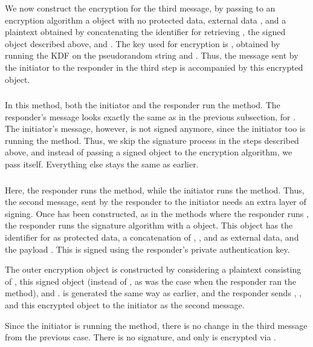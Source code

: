 We now construct the encryption for the third message, by passing to an \mAead encryption algorithm a \mCose object with no protected data, external data \mTHthree, and a plaintext obtained by concatenating the identifier for retrieving \mCredi, the signed object described above, and \mADthree. The key used for encryption is \mKthree, obtained by running the KDF on the pseudorandom string \mPRKthree and \mTHthree. Thus, the message sent by the initiator to the responder in the third step is \mCr accompanied by this encrypted object.

\subsubsection{\mStatStat}
In this method, both the initiator and the responder run the \mStat method. The responder's message looks exactly the same as in the previous subsection, for \mSigStat. The initiator's message, however, is not signed anymore, since the initiator too is running the \mStat method. Thus, we skip the signature process in the steps described above, and instead of passing a signed object to the \mAead encryption algorithm, we pass \mMacthree itself. Everything else stays the same as earlier.

\subsubsection{\mStatSig}
Here, the responder runs the \mSig method, while the initiator runs the \mStat method. Thus, the second message, sent by the responder to the initiator needs an extra layer of signing. Once \mMactwo has been constructed, as in the methods where the responder runs \mStat, the responder runs the signature algorithm with a \mCose object. This object has the identifier for \mCredr as protected data, a concatenation of \mTHtwo, \mCredr, and \mADtwo as external data, and the payload \mMactwo. This is signed using the responder's private authentication key.

The outer encryption object is constructed by considering a plaintext consisting of \mCredr, this signed object (instead of \mMactwo, as was the case when the responder ran the \mStat method), and \mADtwo. \mKtwo is generated the same way as earlier, and the responder sends \mGy, \mCr, and this encrypted object to the initiator as the second message.

Since the initiator is running the \mStat method, there is no change in the third message from the previous case. There is no signature, and only \mMacthree is encrypted via \mAead.

